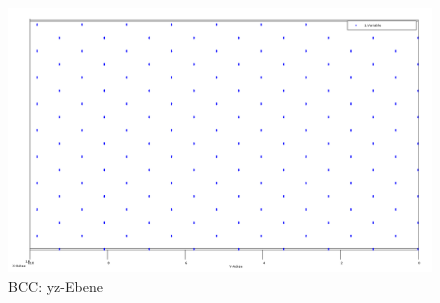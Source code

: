 \begin{figure}[H]
\begin{minipage}[b]{0.3\textwidth}
    \centering
    \includegraphics[scale=0.12]{data/bcc_y-z.PNG}
    \caption{BCC: yz-Ebene}
    \label{fig:bccyz}
\end{minipage} 
\end{figure}

